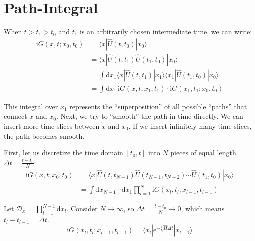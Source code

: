 \section{Path-Integral}

When $t > t_1 > t_0$ and $t_1$ is an arbitrarily chosen intermediate time,
we can write:
\begin{equation}
    \begin{aligned}
    \mathrm{i}G(x, t; x_0, t_0) &= \langle x | \hat{U}(t, t_0) | x_0 \rangle \\
    &= \langle x | \hat{U}(t, t_1) \hat{U}(t_1, t_0) | x_0 \rangle \\
    &= \int \mathrm{d}x_1 \langle x | \hat{U}(t, t_1) | x_1 \rangle \langle x_1 | \hat{U}(t_1, t_0) | x_0 \rangle \\
    &= \int \mathrm{d}x_1 \, \mathrm{i}G(x, t; x_1, t_1) \cdot \mathrm{i}G(x_1, t_1; x_0, t_0)
    \end{aligned}
\end{equation}

This integral over $x_1$ represents the \enquote{superposition} of all possible \enquote{paths} that connect $x$ and $x_0$.
Next, we try to \enquote{smooth} the path in time directly.
We can insert more time slices between $x$ and $x_0$.
If we insert infinitely many time slices, the path becomes smooth.

\begin{center}

\end{center}

First, let us discretize the time domain $[t_0, t]$ into $N$ pieces of equal length $\Delta t = \frac{t-t_0}{N}$:
\begin{equation}
\begin{aligned}
\mathrm{i}G(x, t; x_0, t_0) &= \langle x | \hat{U}(t, t_{N-1}) \hat{U}(t_{N-1}, t_{N-2}) \cdots \hat{U}(t_1, t_0) | x_0 \rangle \\
&= \int \mathrm{d}x_{N-1} \cdots \mathrm{d}x_1 \prod_{l=1}^{N} \mathrm{i}G(x_l, t_l; x_{l-1}, t_{l-1})
\end{aligned}
\end{equation}

Let $\mathcal{D}_x = \prod_{l=1}^{N-1} \mathrm{d}x_l$.
Consider $N \to \infty$, so $\Delta t = \frac{t-t_0}{N} \to 0$, which means $t_l - t_{l-1} = \Delta t$.
\begin{equation}
    \label{eq:path_integral}
    \mathrm{i}G(x_l, t_l; x_{l-1}, t_{l-1}) = \langle x_l | \mathrm{e}^{-\frac{\mathrm{i}}{\hbar}\hat{H}\Delta t} | x_{l-1} \rangle
\end{equation}

